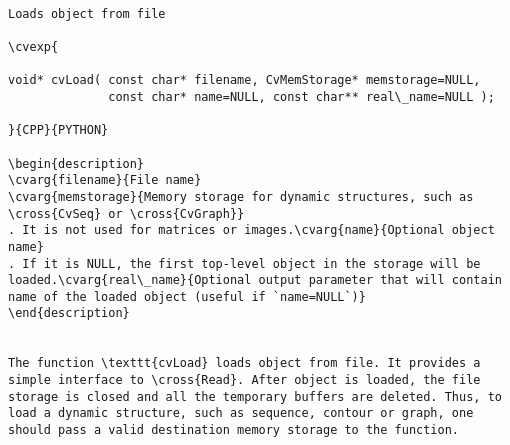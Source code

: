 \begin{verbatim}

Loads object from file

\cvexp{

void* cvLoad( const char* filename, CvMemStorage* memstorage=NULL,
              const char* name=NULL, const char** real\_name=NULL );

}{CPP}{PYTHON}

\begin{description}
\cvarg{filename}{File name}
\cvarg{memstorage}{Memory storage for dynamic structures, such as \cross{CvSeq} or \cross{CvGraph}}
. It is not used for matrices or images.\cvarg{name}{Optional object name}
. If it is NULL, the first top-level object in the storage will be loaded.\cvarg{real\_name}{Optional output parameter that will contain name of the loaded object (useful if `name=NULL`)}
\end{description}


The function \texttt{cvLoad} loads object from file. It provides a simple interface to \cross{Read}. After object is loaded, the file storage is closed and all the temporary buffers are deleted. Thus, to load a dynamic structure, such as sequence, contour or graph, one should pass a valid destination memory storage to the function.


\end{verbatim}
